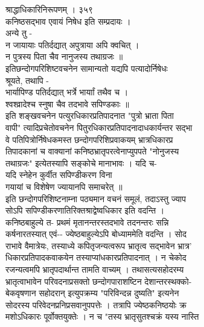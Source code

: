 \documentclass[11pt, openany]{book}
\begin{document}
{{{{{{{{{{{{{{{{{{{{{{{{{{{{{{{{{{{{{{{{{{{{{{{{{{{{{{{{{{{{{{{{{{{{{{{{{{{{{{{{{{{{{{{{{{{{{{{{{{{{{{{{{{{{{{{{{{{{{{{{{{{{{{{{{{{{{{{{{{{{{{{{{{{ श्राद्धाधिकारिनिरूपणम् । ३५९\\
कनिष्ठसद्भाव एवायं निषेध }{इति}{ सम्प्रदायः ।\\
अन्ये तु -\\
}{न}{ जायायाः पतिर्दद्यात् अपुत्राया अपि क्वचित् ।\\
}{न}{ पुत्रस्य पिता चैव नानुजस्य तथाग्रजः ॥\\
इतिछन्दोगपरिशिष्टवचनेन सामान्यतो यद्यपि }{पत्यादोर्निषेधः}{\\
श्रूयते, तथापि -\\
भार्यापिण्ड पतिर्दद्यात् }{भर्त्रे}{ भार्याां तथैव च ।\\
}{श्वश्व्रादेश्च}{ स्नुषा चैव तदभावे सपिण्डकाः ॥\\
}{इति}{ }{शङ्खवचनेन}{ पत्युरधिकारप्रतिपादनात "पुत्रो भ्राता पिता\\
वापी" त्यादिप्रचेतोवचनेन पितुरधिकारप्रतिपादनादाधकार्यन्तर सद्भा\\
वे पतिपित्रोर्निषेधकमस्त छन्दोगपरिशिप्रवाकयम् भ्रात्रधिकारप्र\\
तिपादकानां च वाक्यानां कनिष्ठभ्रातृपरत्वेनाप्युपपते }{"नोनुजस्य}{\\
तथाग्रजः" इत्येतस्यापि सङ्कोचे मानाभावः । यदि च-\\
यदि }{स्नेहेन}{ कुर्वीत सपिण्डीकरण विना \textbar{}\\
गयायां च विशेषेण ज्यायानपि समाचरेत् ॥\\
}{इति}{ छन्दोगपरिशिष्टनाम्ना पठ्यमान वचनं समूलं, तदाऽस्तु ज्याप\\
सोऽपि सपिण्डीकरणातिरिक्तश्राद्वेष्वधिकार }{इति}{ वदन्ति ।\\
}{कनिष्ठबाहुल्ये}{ त- प्रथमं मृतानन्तरस्तदभावे तदनन्तरः सन्नि\\
कर्षनारतस्यात् एवं-\/- ज्येष्ठबाहुल्येऽपि बोध्याममेति वदन्ति । सोद\\
राभावे वैमात्रेयः, तस्याध्ये कपितृजन्यत्वरूप भ्रातृत्व सद्भावेन
भ्रात्र'\\
धिकारप्रतिपादकवाकयेन तस्याप्यांधकारप्रतिपादनात् । }{न}{ चेकोद\\
रजन्यत्वमपि भ्रातृपदार्थान्त तामति वाच्यम् । तथासत्यसहोदरम्य\\
भ्रातृत्वाभावेन परिवदनाप्रसक्तो छन्दोगपाराशष्टिन देशान्तरस्थक्को-\\
बेकवृषणान सहोदरान् इत्युपक्रम्य "परिविन्दन्न दुष्यति" इत्यनेन\\
सोदरस्य परिवेदनप्रनिप्रसवानुपपत्तेः । तत्रापि ज्येष्ठकनिष्ठयोः क्र\\
मशोऽधिकारः पूर्वोक्तयुक्तेः । न च "तस्य भ्रातृसुतश्चक्रं यस्य
नास्ति\\
}}}}}}}}}}}}}}}}}}}}}}}}}}}}}}}}}}}}}}}}}}}}}}}}}}}}}}}}}}}}}}}}}}}}}}}}}}}}}}}}}}}}}}}}}}}}}}}}}}}}}}}}}}}}}}}}}}}}}}}}}}}}}}}}}}}}}}}}}}}}}}}}}}}
\end{document}
